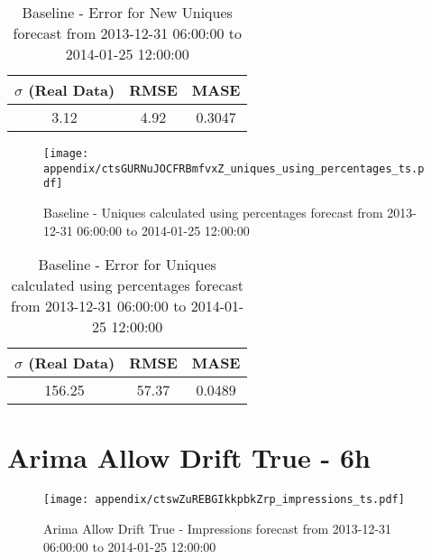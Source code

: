 \begin{table}[H]
\centering
\footnotesize
\begin{tabular}{ccc}
$\sigma$ (Real Data) & RMSE & MASE   \\ \hline
3.12 & 4.92 & 0.3047 \\
\end{tabular}

\vspace{0.5cm}

\caption{
Baseline - Error for New Uniques forecast from 2013-12-31 06:00:00 to 2014-01-25 12:00:00}
\end{table}

\begin{figure}[H] \begin{center} \leavevmode
\texttt{[image: appendix/ctsGURNuJOCFRBmfvxZ\_uniques\_using\_percentages\_ts.pdf]} \caption{
Baseline - Uniques calculated using percentages forecast from 2013-12-31 06:00:00 to 2014-01-25 12:00:00} \label{fig:appendix/ctsGURNuJOCFRBmfvxZ_uniques_using_percentages_ts.pdf} \end{center}
\end{figure}

\begin{table}[H]
\centering
\footnotesize
\begin{tabular}{ccc}
$\sigma$ (Real Data) & RMSE & MASE   \\ \hline
156.25 & 57.37 & 0.0489 \\
\end{tabular}

\vspace{0.5cm}

\caption{
Baseline - Error for Uniques calculated using percentages forecast from 2013-12-31 06:00:00 to 2014-01-25 12:00:00}
\end{table}

\section{Arima Allow Drift True - 6h}
\begin{figure}[H] \begin{center} \leavevmode
\texttt{[image: appendix/ctswZuREBGIkkpbkZrp\_impressions\_ts.pdf]} \caption{
Arima Allow Drift True - Impressions forecast from 2013-12-31 06:00:00 to 2014-01-25 12:00:00} \label{fig:appendix/ctswZuREBGIkkpbkZrp_impressions_ts.pdf} \end{center}
\end{figure}

